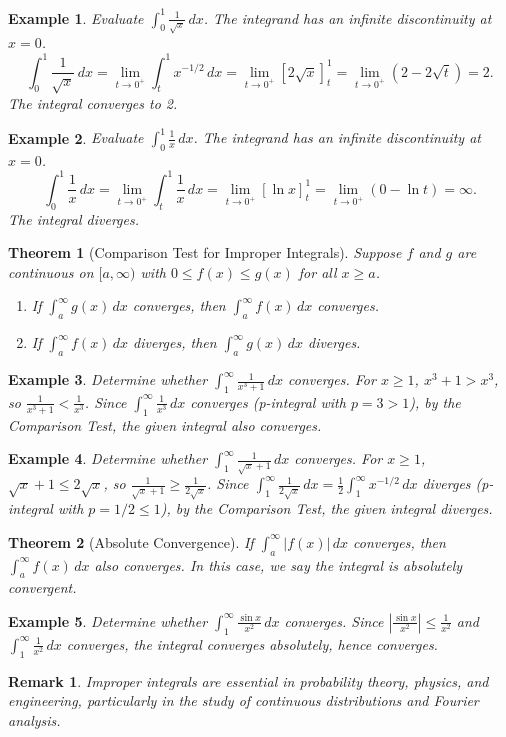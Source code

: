 \documentclass[11pt,a4paper]{article}
\newtheorem{example}{Example}
\newtheorem{theorem}{Theorem}
\newtheorem{remark}{Remark}
\begin{document}
\begin{example}
Evaluate $\displaystyle \int_0^1 \frac{1}{\sqrt{x}} \, dx$.
The integrand has an infinite discontinuity at $x = 0$.
\[
\int_0^1 \frac{1}{\sqrt{x}} \, dx = \lim_{t \to 0^+} \int_t^1 x^{-1/2} \, dx = \lim_{t \to 0^+} \left[ 2\sqrt{x} \right]_t^1 = \lim_{t \to 0^+} (2 - 2\sqrt{t}) = 2.
\]
The integral converges to 2.
\end{example}
\begin{example}
Evaluate $\displaystyle \int_0^1 \frac{1}{x} \, dx$.
The integrand has an infinite discontinuity at $x = 0$.
\[
\int_0^1 \frac{1}{x} \, dx = \lim_{t \to 0^+} \int_t^1 \frac{1}{x} \, dx = \lim_{t \to 0^+} [\ln x]_t^1 = \lim_{t \to 0^+} (0 - \ln t) = \infty.
\]
The integral diverges.
\end{example}
\begin{theorem}[Comparison Test for Improper Integrals]
Suppose $f$ and $g$ are continuous on $[a, \infty)$ with $0 \leq f(x) \leq g(x)$ for all $x \geq a$.
\begin{enumerate}
\item If $\displaystyle \int_a^{\infty} g(x) \, dx$ converges, then $\displaystyle \int_a^{\infty} f(x) \, dx$ converges.
\item If $\displaystyle \int_a^{\infty} f(x) \, dx$ diverges, then $\displaystyle \int_a^{\infty} g(x) \, dx$ diverges.
\end{enumerate}
\end{theorem}
\begin{example}
Determine whether $\displaystyle \int_1^{\infty} \frac{1}{x^3 + 1} \, dx$ converges.
For $x \geq 1$, $x^3 + 1 > x^3$, so $\frac{1}{x^3 + 1} < \frac{1}{x^3}$. Since $\int_1^{\infty} \frac{1}{x^3} \, dx$ converges (p-integral with $p = 3 > 1$), by the Comparison Test, the given integral also converges.
\end{example}
\begin{example}
Determine whether $\displaystyle \int_1^{\infty} \frac{1}{\sqrt{x} + 1} \, dx$ converges.
For $x \geq 1$, $\sqrt{x} + 1 \leq 2\sqrt{x}$, so $\frac{1}{\sqrt{x} + 1} \geq \frac{1}{2\sqrt{x}}$. Since $\int_1^{\infty} \frac{1}{2\sqrt{x}} \, dx = \frac{1}{2} \int_1^{\infty} x^{-1/2} \, dx$ diverges (p-integral with $p = 1/2 \leq 1$), by the Comparison Test, the given integral diverges.
\end{example}
\begin{theorem}[Absolute Convergence]
If $\displaystyle \int_a^{\infty} |f(x)| \, dx$ converges, then $\displaystyle \int_a^{\infty} f(x) \, dx$ also converges. In this case, we say the integral is \textit{absolutely convergent}.
\end{theorem}
\begin{example}
Determine whether $\displaystyle \int_1^{\infty} \frac{\sin x}{x^2} \, dx$ converges.
Since $\left| \frac{\sin x}{x^2} \right| \leq \frac{1}{x^2}$ and $\int_1^{\infty} \frac{1}{x^2} \, dx$ converges, the integral converges absolutely, hence converges.
\end{example}
\begin{remark}
Improper integrals are essential in probability theory, physics, and engineering, particularly in the study of continuous distributions and Fourier analysis.
\end{remark}
\end{document}
